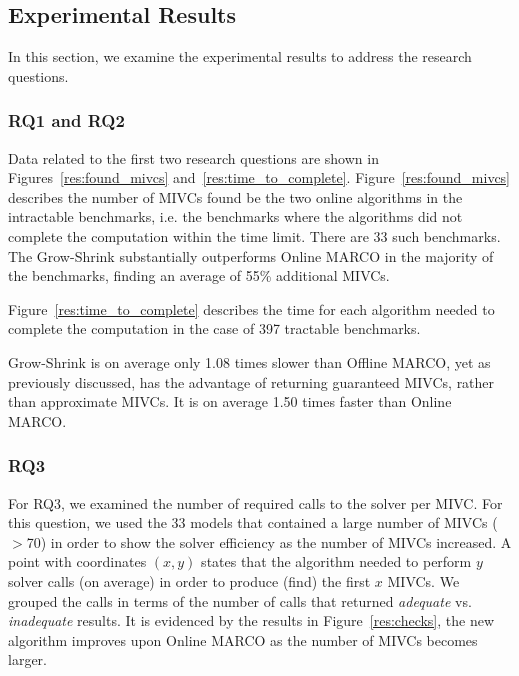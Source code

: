 


\subsection{Experimental Results}
In this section, we examine the experimental results to address the research questions.


\subsubsection{RQ1 and RQ2}
Data related to the first two research questions are shown in Figures~\ref{res:found_mivcs} and~\ref{res:time_to_complete}.
Figure~\ref{res:found_mivcs} describes the number of MIVCs found be the two online algorithms in the intractable benchmarks, i.e. the benchmarks where the algorithms did not complete the computation within the time limit. There are 33 such benchmarks. The Grow-Shrink substantially outperforms Online MARCO in the majority of the benchmarks, finding an average of 55\% additional MIVCs.

Figure~\ref{res:time_to_complete} describes the time for each algorithm needed to complete the computation in the case of 397 tractable benchmarks.

Grow-Shrink is on
average only 1.08 times slower than Offline MARCO,
yet as previously discussed,
has the advantage of returning guaranteed MIVCs,
rather than approximate MIVCs.
It is on average 1.50 times faster than Online MARCO.





\subsubsection{RQ3}  For RQ3, we examined the number of required calls to the solver per MIVC.  For this question, we used the 33 models that contained a large number of MIVCs ($>$70) in order to show the solver efficiency as the number of MIVCs increased.  A point with coordinates $(x,y)$ states that the algorithm needed to perform $y$ solver calls (on average) in order to produce (find) the first $x$ MIVCs. We grouped the calls in terms of the number of calls that returned {\em adequate} vs. {\em inadequate} results.  It is evidenced by the results in Figure~\ref{res:checks}, the new algorithm improves upon Online MARCO as the number of MIVCs becomes larger.

